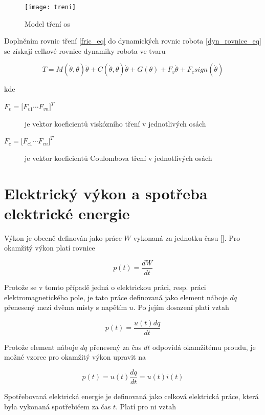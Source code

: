 \newpage
\begin{figure}[ht]
\texttt{[image: treni]}
\caption{Model tření os}
\label{treni_pic}
\end{figure}

Doplněním rovnic tření \ref{fric_eq} do dynamických rovnic robota \ref{dyn_rovnice_eq} se získají celkové rovnice dynamiky robota ve tvaru

\begin{equation}
T = M(\dot{\theta},\theta)\ddot{\theta} + C(\dot{\theta},\theta)\dot{\theta} + G(\theta) + F_v\dot{\theta} + F_csign(\dot{\theta})
\label{celkova_dyn_rovnice_eq}
\end{equation}

kde

\begin{description}
\item[$F_v = {\big[F_{v1}  \dotsm  F_{vn}\big]}^{T}$] je vektor koeficientů viskózního tření v jednotlivých osách
\item[$F_c = {\big[F_{c1}  \dotsm  F_{cn}\big]}^{T}$] je vektor koeficientů Coulombova tření v jednotlivých osách
\end{description}

\section{Elektrický výkon a spotřeba elektrické energie}
\label{el_vykon_ch}
Výkon je obecně definován jako práce $W$ vykonaná za jednotku času [\cite{zemanek}]. Pro okamžitý výkon platí rovnice

\begin{equation}
p(t) = \frac{dW}{dt}
\end{equation}

Protože se v tomto případě jedná o elektrickou práci, resp. práci elektromagnetického pole, je tato práce definovaná jako element náboje $dq$ přenesený mezi dvěma místy s napětím $u$. Po jejím dosazení platí vztah

\begin{equation}
p(t) = \frac{u(t)dq}{dt}
\end{equation}

Protože element náboje $dq$ přenesený za čas $dt$ odpovídá okamžitému proudu, je možné vzorec pro okamžitý výkon upravit na

\begin{equation}
p(t) = u(t)\frac{dq}{dt} = u(t)i(t)
\end{equation}

Spotřebovaná elektrická energie je definovaná jako celková elektrická práce, která byla vykonaná spotřebičem za čas $t$. Platí pro ni vztah

